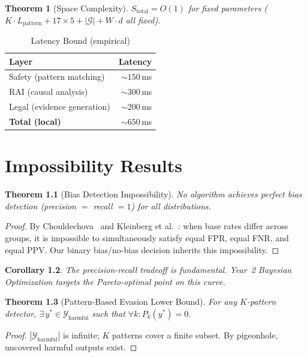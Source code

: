 \documentclass[12pt,a4paper]{report}
\theoremstyle{plain}
\newtheorem{theorem}{Theorem}[chapter]
\newtheorem{corollary}[theorem]{Corollary}
\theoremstyle{definition}
\theoremstyle{remark}
\newcommand{\outputspace}{\mathcal{Y}}
\begin{document}
\begin{theorem}[Space Complexity]
$S_{\text{total}} = O(1)$ for fixed parameters
($K{\cdot}L_{\text{pattern}} + 17{\times}5
+ |\mathcal{G}| + W{\cdot}d$ all fixed).
\end{theorem}

\begin{table}[htbp]
\centering
\caption{Latency Bound (empirical)}
\begin{tabular}{lr}
\toprule
\textbf{Layer} & \textbf{Latency} \\
\midrule
Safety (pattern matching)    & ${\sim}150$\,ms \\
RAI (causal analysis)        & ${\sim}300$\,ms \\
Legal (evidence generation)  & ${\sim}200$\,ms \\
\midrule
\textbf{Total (local)}       & ${\sim}650$\,ms \\
\bottomrule
\end{tabular}
\end{table}

\chapter{Impossibility Results}
\label{ch:impossible}

\begin{theorem}[Bias Detection Impossibility]
No algorithm achieves perfect bias detection
(precision $=$ recall $= 1$) for all distributions.
\end{theorem}
\begin{proof}
By Chouldechova~\cite{chouldechova2017} and
Kleinberg et al.~\cite{kleinberg2016}:
when base rates differ across groups, it is impossible
to simultaneously satisfy equal FPR, equal FNR,
and equal PPV. Our binary bias/no-bias decision
inherits this impossibility.
\end{proof}

\begin{corollary}
The precision-recall tradeoff is fundamental.
Year~2 Bayesian Optimization targets the
Pareto-optimal point on this curve.
\end{corollary}

\begin{theorem}[Pattern-Based Evasion Lower Bound]
For any $K$-pattern detector, $\exists\, y^*
\in \outputspace_{\text{harmful}}$ such that
$\forall k: P_k(y^*) = 0$.
\end{theorem}
\begin{proof}
$|\outputspace_{\text{harmful}}|$ is infinite;
$K$ patterns cover a finite subset. By pigeonhole,
uncovered harmful outputs exist.
\end{proof}
\end{document}
